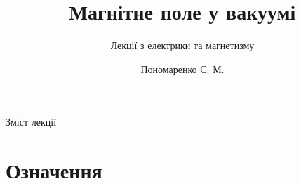 \documentclass{beamer}
\title[Лекції електрики та магнетизму]{\huge\bfseries Магнітне поле у вакуумі}
\subtitle{Лекції з електрики та магнетизму}
\author{Пономаренко С. М.}
\date{}
\begin{document}
\begin{frame}[plain]
	\maketitle
\end{frame}

\begin{frame}{Зміст лекції}{}
	\tableofcontents
\end{frame}



\section{Означення}
\end{document}
